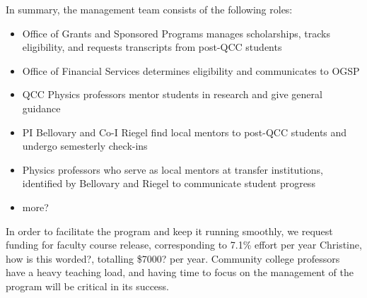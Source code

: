 \documentclass[12pt]{article}
\newcommand\reword[1]{{\color{red}#1}}
\begin{document}
In summary, the management team consists of the following roles:
\begin{itemize}
\setlength{\itemsep}{-\parsep}
\setlength{\topsep}{-\parsep}
\setlength{\partopsep}{-\parsep}
	\item Office of Grants and Sponsored Programs manages scholarships, tracks eligibility, and requests transcripts from post-QCC students
	\item Office of Financial Services determines eligibility and communicates to OGSP
	\item QCC Physics professors mentor students in research and give general guidance
	\item PI Bellovary and Co-I Riegel find local mentors to post-QCC students and undergo semesterly check-ins
	\item Physics professors who serve as local mentors at transfer institutions, identified by Bellovary and Riegel to communicate student progress
	\item more?
\end{itemize}	


In order to facilitate the program and keep it running smoothly, we request funding for faculty course release, corresponding to 7.1\% effort per year \reword{Christine, how is this worded?}, totalling \$7000? per year.  Community college professors have a heavy teaching load, and having time to focus on the management of the program will be critical in its success.

 
\end{document}

